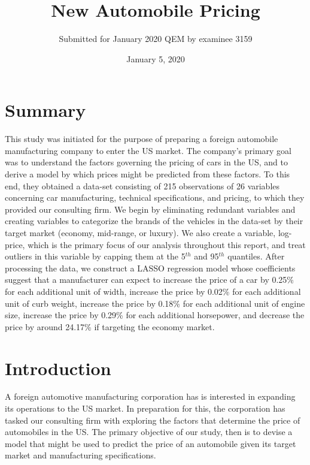 \documentclass[a4paper, 10pt, titlepage]{article}
\title{New Automobile Pricing}
\author{Submitted for January 2020 QEM by examinee 3159}
\date{January 5, 2020}
\begin{document}
\maketitle
\tableofcontents
\listoffigures
\listoftables

\newpage

\section*{Summary}
This study was initiated for the purpose of preparing a foreign automobile manufacturing company to enter the US market. The company's primary goal was to understand the factors governing the pricing of cars in the US, and to derive a model by which prices might be predicted from these factors. To this end, they obtained a data-set consisting of 215 observations of 26 variables concerning car manufacturing, technical specifications, and pricing, to which they provided our consulting firm. 
We begin by eliminating redundant variables and creating variables to categorize the brands of the vehicles in the data-set by their target market (economy, mid-range, or luxury). We also create a variable, log-price, which is the primary focus of our analysis throughout this report, and treat outliers in this variable by capping them at the 5$^{th}$ and 95$^{th}$ quantiles. 
After processing the data, we construct a LASSO regression model whose coefficients suggest that a manufacturer can expect to increase the price of a car by 0.25\% for each additional unit of width, increase the price by 0.02\% for each additional unit of curb weight, increase the price by 0.18\% for each additional unit of engine size, increase the price by 0.29\% for each additional horsepower, and decrease the price by around 24.17\% if targeting the economy market.

\section{Introduction}
A foreign automotive manufacturing corporation has is interested in expanding its operations to the US market. In preparation for this, the corporation has tasked our consulting firm with exploring the factors that determine the price of automobiles in the US. The primary objective of our study, then is to devise a model that might be used to predict the price of an automobile given its target market and manufacturing specifications.
\end{document}
